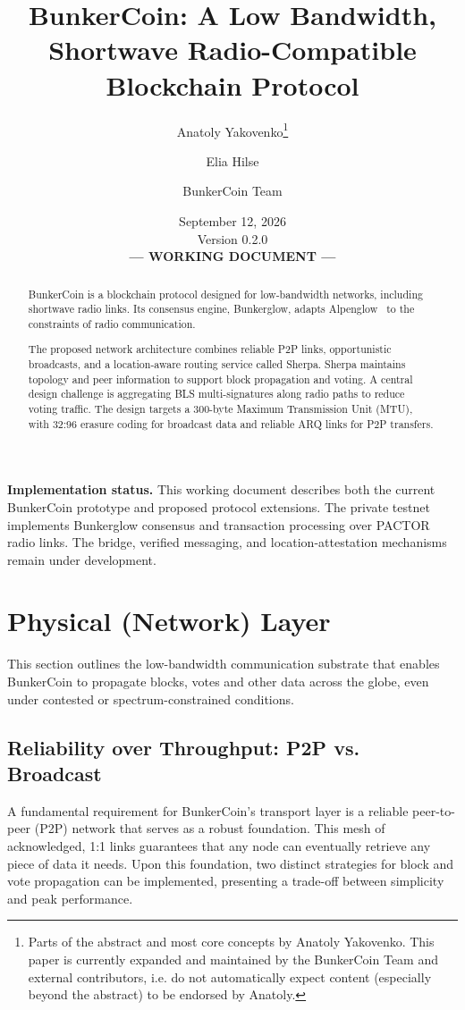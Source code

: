 \documentclass{article}
\title{BunkerCoin: A Low Bandwidth, Shortwave Radio-Compatible Blockchain Protocol}
\author{Anatoly Yakovenko\thanks{Parts of the abstract and most core concepts by Anatoly Yakovenko. This paper is currently expanded and maintained by the BunkerCoin Team and external contributors, i.e. do not automatically expect content (especially beyond the abstract) to be endorsed by Anatoly.} \and{Elia Hilse} \and{BunkerCoin Team}}
\date{September 12, 2026\\Version 0.2.0 \\[1em] \textbf{--- WORKING DOCUMENT ---}}
\begin{document}
\maketitle

\begin{abstract}
BunkerCoin is a blockchain protocol designed for low-bandwidth networks, including shortwave radio links. Its consensus engine, Bunkerglow, adapts Alpenglow~\cite{alpenglow} to the constraints of radio communication.

The proposed network architecture combines reliable P2P links, opportunistic broadcasts, and a location-aware routing service called Sherpa. Sherpa maintains topology and peer information to support block propagation and voting. A central design challenge is aggregating BLS multi-signatures along radio paths to reduce voting traffic. The design targets a 300-byte Maximum Transmission Unit (MTU), with 32:96 erasure coding for broadcast data and reliable ARQ links for P2P transfers.
\end{abstract}

\noindent\textbf{Implementation status.} This working document describes both the current BunkerCoin prototype and proposed protocol extensions. The private testnet implements Bunkerglow consensus and transaction processing over PACTOR radio links. The bridge, verified messaging, and location-attestation mechanisms remain under development.

\section{Physical (Network) Layer}
\label{sec:physical}

This section outlines the low-bandwidth communication substrate that enables BunkerCoin to propagate blocks, votes and other data across the globe, even under contested or spectrum-constrained conditions.

\subsection{Reliability over Throughput: P2P vs. Broadcast}

A fundamental requirement for BunkerCoin's transport layer is a reliable peer-to-peer (P2P) network that serves as a robust foundation. This mesh of acknowledged, 1:1 links guarantees that any node can eventually retrieve any piece of data it needs. Upon this foundation, two distinct strategies for block and vote propagation can be implemented, presenting a trade-off between simplicity and peak performance.
\end{document}
